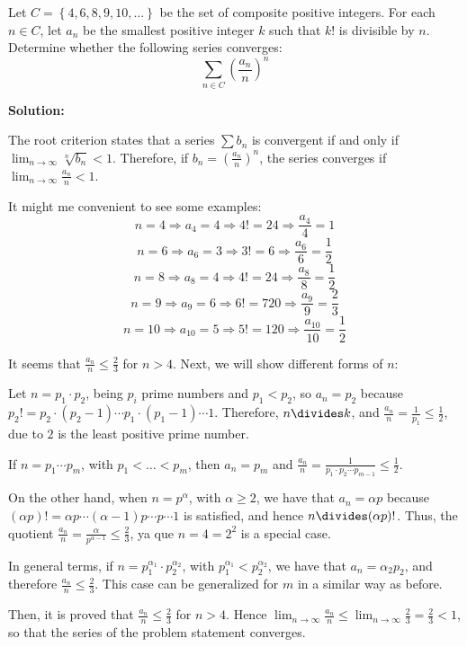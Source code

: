 \documentclass[../../main.tex]{subfiles}
\begin{document}
  \begin{shaded}
    Let $C = \left\{4, 6, 8, 9, 10, \dots\right\}$ be the set of composite positive integers. For each $n \in C$, let $a_n$ be the smallest positive integer $k$ such that $k!$ is divisible by $n$. Determine whether the following series converges:
    $$
    \sum_{n \in C} \left(\frac{a_n}{n}\right)^n
    $$
  \end{shaded}

  \textbf{Solution:}

  The root criterion states that a series $\displaystyle\sum b_n$ is convergent if and only if $\displaystyle\lim_{n \to \infty} \sqrt[n]{b_n} < 1$. Therefore, if $b_n = \left(\displaystyle\frac{a_n}{n}\right)^n$, the series converges if $\displaystyle\lim_{n \to \infty} \displaystyle\frac{a_n}{n} < 1$.

  It might me convenient to see some examples:
  $$
  n = 4 \Longrightarrow a_4 = 4 \Longrightarrow 4! = 24 \Longrightarrow \frac{a_4}{4} = 1
  $$
  $$
  n = 6 \Longrightarrow a_6 = 3 \Longrightarrow 3! = 6 \Longrightarrow \frac{a_6}{6} = \frac{1}{2}
  $$
  $$
  n = 8 \Longrightarrow a_8 = 4 \Longrightarrow 4! = 24 \Longrightarrow \frac{a_8}{8} = \frac{1}{2}
  $$
  $$
  n = 9 \Longrightarrow a_9 = 6 \Longrightarrow 6! = 720 \Longrightarrow \frac{a_9}{9} = \frac{2}{3}
  $$
  $$
  n = 10 \Longrightarrow a_{10} = 5 \Longrightarrow 5! = 120 \Longrightarrow \frac{a_{10}}{10} = \frac{1}{2}
  $$

  It seems that $\displaystyle\frac{a_n}{n} \leq \displaystyle\frac{2}{3}$ for $n > 4$. Next, we will show different forms of $n$:

  Let $n = p_1 \cdot p_2$, being $p_i$ prime numbers and $p_1 < p_2$, so $a_n = p_2$ because $p_2! = p_2 \cdot (p_2 - 1) \cdots p_1 \cdot (p_1 - 1) \cdots 1$. Therefore, $n \divides k$, and $\displaystyle\frac{a_n}{n} = \displaystyle\frac{1}{p_1} \leq \displaystyle\frac{1}{2}$, due to $2$ is the least positive prime number.

  If $n = p_1 \cdots p_m$, with $p_1 < \dots < p_m$, then $a_n = p_m$ and $\displaystyle\frac{a_n}{n} = \displaystyle\frac{1}{p_1 \cdot p_2 \cdots p_{m - 1}} \leq \displaystyle\frac{1}{2}$.

  On the other hand, when $n = p^\alpha$, with $\alpha \geq 2$, we have that $a_n = \alpha p$ because $(\alpha p)! = \alpha p \cdots (\alpha - 1)p \cdots p \cdots 1$ is satisfied, and hence $n \divides (\alpha p)!$. Thus, the quotient $\displaystyle\frac{a_n}{n} = \frac{\alpha}{p^{\alpha - 1}} \leq \displaystyle\frac{2}{3}$, ya que $n = 4 = 2^2$ is a special case.

  In general terms, if $n = p_1^{\alpha_1} \cdot p_2^{\alpha_2}$, with $p_1^{\alpha_1} < p_2^{\alpha_2}$, we have that $a_n = \alpha_2 p_2$, and therefore $\displaystyle\frac{a_n}{n} \leq \displaystyle\frac{2}{3}$. This case can be generalized for $m$ in a similar way as before.

  Then, it is proved that $\displaystyle\frac{a_n}{n} \leq \displaystyle\frac{2}{3}$ for $n > 4$. Hence $\displaystyle\lim_{n \to \infty} \displaystyle\frac{a_n}{n} \leq \displaystyle\lim_{n \to \infty} \displaystyle\frac{2}{3} = \displaystyle\frac{2}{3} < 1$, so that the series of the problem statement converges.
\end{document}
